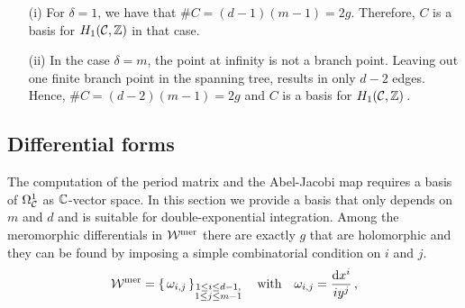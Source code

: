 \documentclass[main.tex]{subfiles}
\begin{document}
  \begin{rmk}
  \begin{itemize}
   \item[(i)] For $\delta = 1$, we have that $\# C = (d-1)(m-1) = 2g$. Therefore, $C$ is a basis for $H_1(\mathcal{C},\mathbb{Z})$ in that case.
   \item[(ii)] In the case $\delta = m$, the point at infinity is not a branch point. Leaving out one finite branch point in the spanning tree, results in only $d-2$ edges. Hence,
   $\#C = (d-2)(m-1) = 2g$ and $C$ is a basis for $H_1(\mathcal{C},\mathbb{Z})$\,.
  \end{itemize}
  \end{rmk}


  
\subsection{Differential forms}\label{subsec:diff_forms}
  
    The computation of the period matrix and the Abel-Jacobi map requires a basis of $\Omega^1_{\mathcal{C}}$ as $\mathbb{C}$-vector space. In this section we provide a basis that only 
   depends on $m$ and $d$ and is suitable for double-exponential integration. \abstand
  Among the meromorphic differentials in $\mathcal{W}^{\text{mer}}$  there are exactly $g$ that are holomorphic  and they can be found by imposing a simple combinatorial condition on $i$ and $j$.
  \begin{align*}
 \mathcal{W}^{\text{mer}} = \left\{ \, \omega_{i,j}  \, \right\}_{\substack{1 \le i \le d-1, \\ 1 \le j \le m-1}} \quad \text{with} \quad \omega_{i,j} = \frac{ \mathrm d x^i}{i y^j}\,,
  \end{align*}

   \bigskip
   
\end{document}
